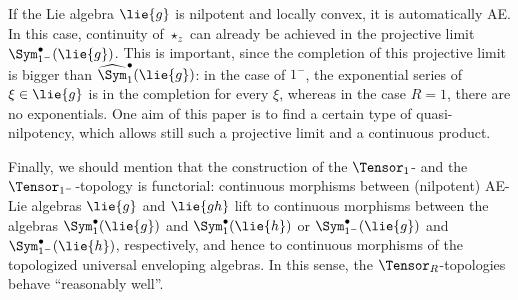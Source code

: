 \documentclass[
11pt,                          %
english                        %
]{article}
\begin{document}
If the Lie algebra $\lie{g}$ is nilpotent and locally convex, it is automatically 
AE. In this case, continuity of $\star_z$ can already be achieved in the projective 
limit $\Sym_{1^-}^{\bullet}(\lie{g})$. This is important, since the completion of 
this projective limit is bigger than $\widehat{\Sym}_1^{\bullet}(\lie{g})$: in the 
case of $1^-$, the exponential series of $\xi \in \lie{g}$ is in the completion for 
every $\xi$, whereas in the case $R = 1$, there are no exponentials. One aim of this 
paper is to find a certain type of quasi-nilpotency, which allows still such a 
projective limit and a continuous product.

Finally, we should mention that the construction of the $\Tensor_1$- and the 
$\Tensor_{1^-}$-topology is functorial: continuous morphisms between (nilpotent) 
AE-Lie algebras $\lie{g}$ and $\lie{gh}$ lift to continuous morphisms between the 
algebras $\Sym_1^{\bullet}(\lie{g})$ and $\Sym_1^{\bullet}(\lie{h})$ or 
$\Sym_{1^-}^{\bullet}(\lie{g})$ and $\Sym_{1^-}^{\bullet}(\lie{h})$, respectively, 
and hence to continuous morphisms of the topologized universal enveloping algebras.
In this sense, the $\Tensor_R$-topologies behave ``reasonably well''.
\end{document}
